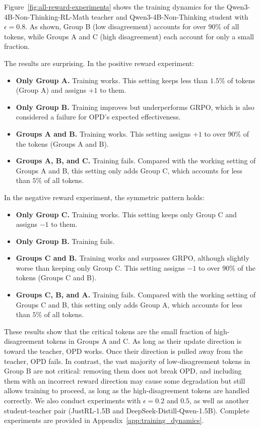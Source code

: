 \documentclass{article}
\theoremstyle{remark}
\begin{document}
Figure~\ref{fig:all-reward-experiments} shows the training dynamics for the Qwen3-4B-Non-Thinking-RL-Math teacher and Qwen3-4B-Non-Thinking student with \(\epsilon = 0.8\). As shown, Group B (low disagreement) accounts for over \(90\%\) of all tokens, while Groups A and C (high disagreement) each account for only a small fraction. 

The results are surprising. In the positive reward experiment:
\begin{itemize}
    \item \textbf{Only Group A.} Training works. This setting keeps less than \(1.5\%\) of tokens (Group A) and assigns \(+1\) to them.
    \item \textbf{Only Group B.} Training improves but underperforms GRPO, which is also considered a failure for OPD's expected effectiveness.
    \item \textbf{Groups A and B.} Training works. This setting assigns \(+1\) to over \(90\%\) of the tokens (Groups A and B).
    \item \textbf{Groups A, B, and C.} Training fails. Compared with the working setting of Groups A and B, this setting only adds Group C, which accounts for less than \(5\%\) of all tokens.
\end{itemize}

In the negative reward experiment, the symmetric pattern holds:
\begin{itemize}
    \item \textbf{Only Group C.} Training works. This setting keeps only Group C and assigns \(-1\) to them.
     \item \textbf{Only Group B.} Training fails.
    \item \textbf{Groups C and B.} Training works and surpasses GRPO, although slightly worse than keeping only Group C. This setting assigns \(-1\) to over \(90\%\) of the tokens (Groups C and B).
    \item \textbf{Groups C, B, and A.} Training fails. Compared with the working setting of Groups C and B, this setting only adds Group A, which accounts for less than \(5\%\) of all tokens.
\end{itemize}

These results show that the critical tokens are the small fraction of high-disagreement tokens in Groups A and C. As long as their update direction is toward the teacher, OPD works. Once their direction is pulled away from the teacher, OPD fails. In contrast, the vast majority of low-disagreement tokens in Group B are not critical: removing them does not break OPD, and including them with an incorrect reward direction may cause some degradation but still allows training to proceed, as long as the high-disagreement tokens are handled correctly. We also conduct experiments with \(\epsilon = 0.2\) and \(0.5\), as well as another student-teacher pair (JustRL-1.5B and DeepSeek-Distill-Qwen-1.5B). Complete experiments are provided in Appendix~\ref{app:training_dynamics}.
\end{document}
